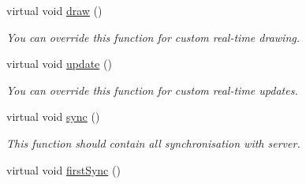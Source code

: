 \begin{DoxyCompactItemize}
\item 
virtual void \hyperlink{classGame_a03387676134dd331f4a1902349926816}{draw} ()\hypertarget{classGame_a03387676134dd331f4a1902349926816}{}\label{classGame_a03387676134dd331f4a1902349926816}

\begin{DoxyCompactList}\small\item\em You can override this function for custom real-\/time drawing. \end{DoxyCompactList}\item 
virtual void \hyperlink{classGame_a51e7f9bfbb9a2d29525b6ea009ebc345}{update} ()\hypertarget{classGame_a51e7f9bfbb9a2d29525b6ea009ebc345}{}\label{classGame_a51e7f9bfbb9a2d29525b6ea009ebc345}

\begin{DoxyCompactList}\small\item\em You can override this function for custom real-\/time updates. \end{DoxyCompactList}\item 
virtual void \hyperlink{classGame_aab44617eccac431efb47e8737740b9f6}{sync} ()\hypertarget{classGame_aab44617eccac431efb47e8737740b9f6}{}\label{classGame_aab44617eccac431efb47e8737740b9f6}

\begin{DoxyCompactList}\small\item\em This function should contain all synchronisation with server. \end{DoxyCompactList}\item 
virtual void \hyperlink{classGame_a91de9baa89af357070ccee44c6f0a21e}{first\+Sync} ()\hypertarget{classGame_a91de9baa89af357070ccee44c6f0a21e}{}\label{classGame_a91de9baa89af357070ccee44c6f0a21e}


\end{DoxyCompactItemize}
